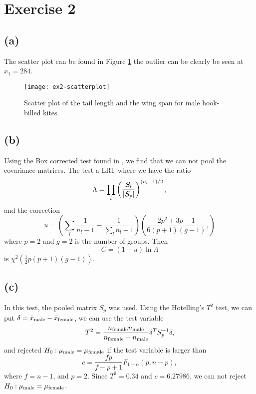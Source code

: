 
\section*{Exercise 2}
\label{sec:exercise-2}

\subsection*{(a)}
\label{sec:a-1}

The scatter plot can be found in Figure \ref{fig:ex2-scatter} the outlier can be
clearly be seen at $x_1 = 284$.
\begin{figure}[h]
  \centering
  \texttt{[image: ex2-scatterplot]}
  \caption{Scatter plot of the tail length and the wing span for male
    hook-billed kites.}
  \label{fig:ex2-scatter}
\end{figure}

\subsection*{(b)}
\label{sec:b-1}

Using the Box corrected test found in \cite[p.311]{book}, we find that
we can not pool the covariance matrices. The test a LRT where we have
the ratio
\begin{equation*}
\Lambda =   \prod_{l}\left(\frac{|\bm{S}_{l}|}{|\bm{S}_{p}|}
  \right)^{(n_{l}-1)/2},
\end{equation*}
and the correction
\begin{equation*}
  u = 
  \left(
    \sum_{l}\frac{1}{n_{l}-1}-\frac{1}{\sum_{l}n_{l}-1}
  \right)
  \left(
    \frac{2p^{2} + 3p -1}{6(p+1)(g-1)},
  \right)
\end{equation*}
where $p = 2$ and $g = 2$ is the number of groups. Then
\begin{equation*}
  C = (1-u)\ln \Lambda
\end{equation*}
is $\chi^{2}(\frac 12 p(p+1)(g-1))$.
\subsection*{(c)}
\label{sec:c-1}

In this test, the pooled matrix $S_p$ was used. Using the Hotelling's
$T^2$ test, we can put $\delta = \bar{x}_{\rm male}- \bar{x}_{\rm
  female}$, we can use the test variable
\begin{equation*}
  T^2 = \frac{n_{\rm female}  n_{\rm male}}{n_{\rm female} +  n_{\rm male}}\delta^T S_p^{-1}\delta,
  \label{eq:1}
\end{equation*}
and rejected $H_0: \mu_{\rm male} = \mu_{\rm female}$ if the test
variable is larger than
\begin{equation*}
 c  = \frac{fp}{f-p+1}F_{1-\alpha}(p, n-p), %
\end{equation*}
where $f = n - 1$, and $p = 2$. Since $T^2 = 0.34$ and $c =
6.27986$, we can not reject $H_0: \mu_{\rm male} = \mu_{\rm female} $.

